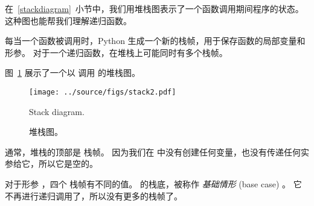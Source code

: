{{{{    
    



在~\ref{stackdiagram}~小节中，我们用堆栈图表示了一个函数调用期间程序的状态。
这种图也能帮我们理解递归函数。


每当一个函数被调用时，Python 生成一个新的栈帧，用于保存函数的局部变量和形参。
对于一个递归函数，在堆栈上可能同时有多个栈帧。


图~\ref{fig.stack2} 展示了一个以  调用  的堆栈图。

\begin{figure}
\centerline
{\texttt{[image: ../source/figs/stack2.pdf]}}
\caption{Stack diagram.}
\caption{堆栈图。}
\label{fig.stack2}
\end{figure}


  

通常，堆栈的顶部是  栈帧。
因为我们在  中没有创建任何变量，也没有传递任何实参给它，所以它是空的。


对于形参  ，四个  栈帧有不同的值。  的栈底，被称作 {\em 基础情形} (base case) 。 它不再进行递归调用了，所以没有更多的栈帧了。


}}}}
